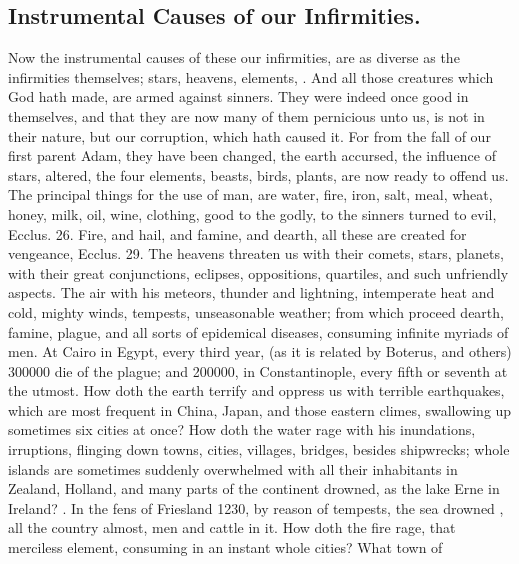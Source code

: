 {\subsection{Instrumental Causes of our Infirmities.}
Now the instrumental causes
of these our infirmities, are as diverse as the infirmities themselves;
stars, heavens, elements, \etc{}. And all those creatures which God hath
made, are armed against sinners. They were indeed once good in
themselves, and that they are now many of them pernicious unto us, is
not in their nature, but our corruption, which hath caused it. For from
the fall of our first parent Adam, they have been changed, the earth
accursed, the influence of stars, altered, the four elements, beasts,
birds, plants, are now ready to offend us. The principal things for the
use of man, are water, fire, iron, salt, meal, wheat, honey, milk, oil,
wine, clothing, good to the godly, to the sinners turned to evil,
Ecclus.  26. Fire, and hail, and famine, and dearth, all these
are created for vengeance, Ecclus.  29. The heavens threaten us
with their comets, stars, planets, with their great conjunctions,
eclipses, oppositions, quartiles, and such unfriendly aspects. The air
with his meteors, thunder and lightning, intemperate heat and cold,
mighty winds, tempests, unseasonable weather; from which proceed
dearth, famine, plague, and all sorts of epidemical diseases, consuming
infinite myriads of men. At Cairo in Egypt, every third year, (as it is
related by Boterus, and others) 300\thinspace{}000 die of the plague; and
200\thinspace{}000, in Constantinople, every fifth or seventh at the utmost. How
doth the earth terrify and oppress us with terrible earthquakes, which
are most frequent in China, Japan, and those eastern climes,
swallowing up sometimes six cities at once? How doth the water rage
with his inundations, irruptions, flinging down towns, cities,
villages, bridges, \etc{} besides shipwrecks; whole islands are sometimes
suddenly overwhelmed with all their inhabitants in Zealand,
Holland, and many parts of the continent drowned, as the lake Erne
in Ireland? . In the fens of Friesland 1230, by reason of tempests, the
sea drowned , all the
country almost, men and cattle in it. How doth the fire rage, that
merciless element, consuming in an instant whole cities? What town of
}
